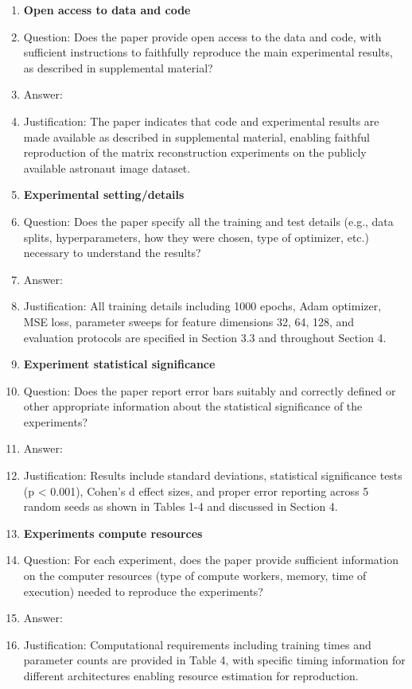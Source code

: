 \documentclass{article}
\begin{document}
\begin{enumerate}
\item {\bf Open access to data and code}
    \item[] Question: Does the paper provide open access to the data and code, with sufficient instructions to faithfully reproduce the main experimental results, as described in supplemental material?
    \item[] Answer: \answerYes{}
    \item[] Justification: The paper indicates that code and experimental results are made available as described in supplemental material, enabling faithful reproduction of the matrix reconstruction experiments on the publicly available astronaut image dataset.

\item {\bf Experimental setting/details}
    \item[] Question: Does the paper specify all the training and test details (e.g., data splits, hyperparameters, how they were chosen, type of optimizer, etc.) necessary to understand the results?
    \item[] Answer: \answerYes{}
    \item[] Justification: All training details including 1000 epochs, Adam optimizer, MSE loss, parameter sweeps for feature dimensions {32, 64, 128}, and evaluation protocols are specified in Section 3.3 and throughout Section 4.

\item {\bf Experiment statistical significance}
    \item[] Question: Does the paper report error bars suitably and correctly defined or other appropriate information about the statistical significance of the experiments?
    \item[] Answer: \answerYes{}
    \item[] Justification: Results include standard deviations, statistical significance tests (p < 0.001), Cohen's d effect sizes, and proper error reporting across 5 random seeds as shown in Tables 1-4 and discussed in Section 4.

\item {\bf Experiments compute resources}
    \item[] Question: For each experiment, does the paper provide sufficient information on the computer resources (type of compute workers, memory, time of execution) needed to reproduce the experiments?
    \item[] Answer: \answerYes{}
    \item[] Justification: Computational requirements including training times and parameter counts are provided in Table 4, with specific timing information for different architectures enabling resource estimation for reproduction.


\end{enumerate}
\end{document}

